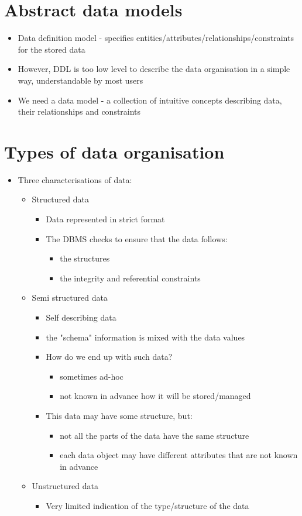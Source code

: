 \documentclass{article}[18pt]
\begin{document}
\section{Abstract data models}
\begin{itemize}
	\item Data definition model - specifies entities/attributes/relationships/constraints for the stored data
	\item However, DDL is too low level to describe the data organisation in a simple way, understandable by most users
	\item We need a data model - a collection of intuitive concepts describing data, their relationships and constraints
\end{itemize}
\section{Types of data organisation}
\begin{itemize}
	\item Three characterisations of data:
	\begin{itemize}
		\item Structured data
		\begin{itemize}
			\item Data represented in strict format
			\item The DBMS checks to ensure that the data follows:
			\begin{itemize}
				\item the structures
				\item the integrity and referential constraints
			\end{itemize}
		\end{itemize}
		\item Semi structured data
		\begin{itemize}
			\item Self describing data
			\item the "schema" information is mixed with the data values
			\item How do we end up with such data?
			\begin{itemize}
				\item sometimes ad-hoc
				\item not known in advance how it will be stored/managed
			\end{itemize}
			\item This data may have some structure, but:
			\begin{itemize}
				\item not all the parts of the data have the same structure
				\item each data object may have different attributes that are not known in advance
			\end{itemize}
		\end{itemize}
		\item Unstructured data
		\begin{itemize}
			\item Very limited indication of the type/structure of the data
		\end{itemize}
	\end{itemize}
\end{itemize}
\end{document}
